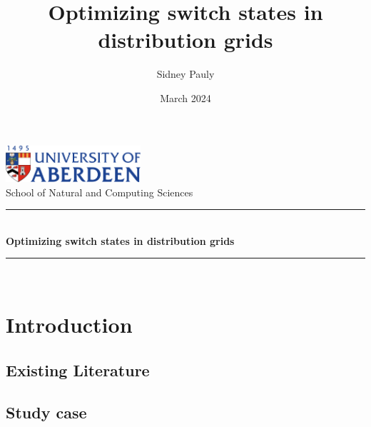 \documentclass[a4paper]{report}
\title{Optimizing switch states in distribution grids}
\author{Sidney Pauly}
\date{March 2024}
\newcommand{\HRule}[1]{\rule{\linewidth}{#1}}
\begin{document}
\begin{titlepage}
	
	\begin{center}
		\includegraphics[width=50mm]{img/ABDN.png}\\[.5cm]
		School of Natural and Computing Sciences\\
		\HRule{2pt} \\
		\LARGE \textbf{Optimizing switch states in distribution grids}
		\HRule{2pt} \\ [0.5cm]
	\end{center}


\end{titlepage}

		
\tableofcontents

\chapter{Introduction}




\section{Existing Literature}



\section{Study case}
\end{document}
